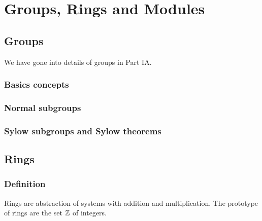 \documentclass[main.tex]{subfiles}
\begin{document}
	\chapter{Groups, Rings and Modules}
		\section{Groups}
		We have gone into details of groups in Part IA.
			\subsection{Basics concepts}
			
			\subsection{Normal subgroups}
			
			\subsection{Sylow subgroups and Sylow theorems}
		\section{Rings}
			\subsection{Definition}
			Rings are abstraction of systems with addition and multiplication. The prototype of rings are the set $\mathbb Z$ of integers.
			
\end{document}
